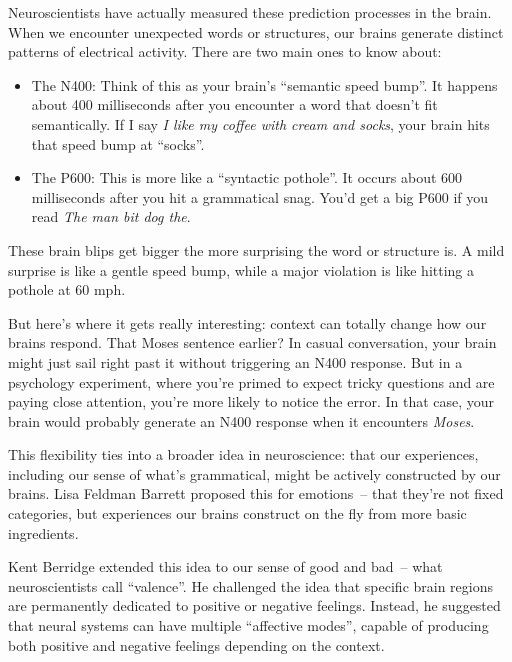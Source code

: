 Neuroscientists have actually measured these prediction processes in the brain. When we encounter unexpected words or structures, our brains generate distinct patterns of electrical activity. There are two main ones to know about:

\begin{itemize}
    \item The N400: Think of this as your brain's ``semantic speed bump''. It happens about 400 milliseconds after you encounter a word that doesn't fit semantically. If I say \textit{I like my coffee with cream and socks}, your brain hits that speed bump at ``socks''.
    \item The P600: This is more like a ``syntactic pothole''. It occurs about 600 milliseconds after you hit a grammatical snag. You'd get a big P600 if you read \textit{The man bit dog the}.
\end{itemize}

These brain blips get bigger the more surprising the word or structure is. A mild surprise is like a gentle speed bump, while a major violation is like hitting a pothole at 60 mph.

But here's where it gets really interesting: context can totally change how our brains respond. That Moses sentence earlier? In casual conversation, your brain might just sail right past it without triggering an N400 response. But in a psychology experiment, where you're primed to expect tricky questions and are paying close attention, you're more likely to notice the error. In that case, your brain would probably generate an N400 response when it encounters \textit{Moses}.

This flexibility ties into a broader idea in neuroscience: that our experiences, including our sense of what's grammatical, might be actively constructed by our brains. Lisa Feldman Barrett proposed this for emotions~-- that they're not fixed categories, but experiences our brains construct on the fly from more basic ingredients.

Kent Berridge extended this idea to our sense of good and bad~-- what neuroscientists call ``valence''. He challenged the idea that specific brain regions are permanently dedicated to positive or negative feelings. Instead, he suggested that neural systems can have multiple ``affective modes'', capable of producing both positive and negative feelings depending on the context.


